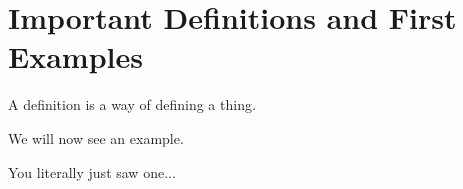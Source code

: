\section{Important Definitions and First Examples}

\begin{boxdefinition}[Definitions]
    A definition is a way of defining a thing.
\end{boxdefinition}

We will now see an example.

\begin{boxexample}[A Definition]
    You literally just saw one...
\end{boxexample}